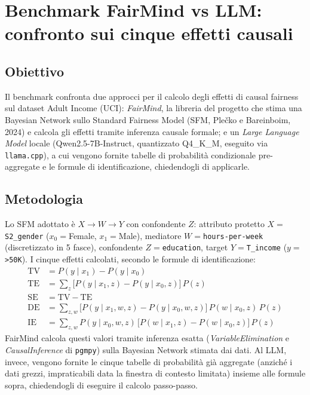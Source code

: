 
\section{Benchmark FairMind vs LLM: confronto sui cinque effetti causali}

\subsection*{Obiettivo}

Il benchmark confronta due approcci per il calcolo degli effetti di causal fairness sul dataset Adult Income (UCI): \emph{FairMind}, la libreria del progetto che stima una Bayesian Network sullo Standard Fairness Model (SFM, Ple\v{c}ko e Bareinboim, 2024) e calcola gli effetti tramite inferenza causale formale; e un \emph{Large Language Model} locale (Qwen2.5-7B-Instruct, quantizzato Q4\_K\_M, eseguito via \texttt{llama.cpp}), a cui vengono fornite tabelle di probabilit\`a condizionale pre-aggregate e le formule di identificazione, chiedendogli di applicarle.

\subsection*{Metodologia}

Lo SFM adottato \`e $X \to W \to Y$ con confondente $Z$: attributo protetto $X{=}$\texttt{S2\_gender} ($x_0{=}$Female, $x_1{=}$Male), mediatore $W{=}$\texttt{hours-per-week} (discretizzato in 5 fasce), confondente $Z{=}$\texttt{education}, target $Y{=}$\texttt{T\_income} ($y{=}$\,\texttt{>50K}). I cinque effetti calcolati, secondo le formule di identificazione:
\begin{align*}
\text{TV} &= P(y \mid x_1) - P(y \mid x_0) \\
\text{TE} &= \textstyle\sum_z \big[P(y \mid x_1, z) - P(y \mid x_0, z)\big] \, P(z) \\
\text{SE} &= \text{TV} - \text{TE} \\
\text{DE} &= \textstyle\sum_{z,w} \big[P(y \mid x_1, w, z) - P(y \mid x_0, w, z)\big] \, P(w \mid x_0, z) \, P(z) \\
\text{IE} &= \textstyle\sum_{z,w} P(y \mid x_0, w, z) \, \big[P(w \mid x_1, z) - P(w \mid x_0, z)\big] \, P(z)
\end{align*}
FairMind calcola questi valori tramite inferenza esatta (\emph{VariableElimination} e \emph{CausalInference} di \texttt{pgmpy}) sulla Bayesian Network stimata dai dati. Al LLM, invece, vengono fornite le cinque tabelle di probabilit\`a gi\`a aggregate (anzich\'e i dati grezzi, impraticabili data la finestra di contesto limitata) insieme alle formule sopra, chiedendogli di eseguire il calcolo passo-passo.

